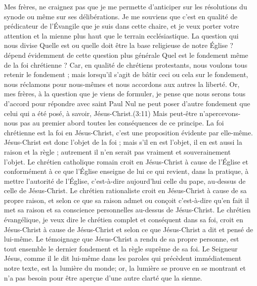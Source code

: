 Mes frères, ne craignez pas que je me permette d’anticiper sur les résolutions du synode ou même sur ses délibérations. Je me souviens que c’est en qualité de prédicateur de l’Évangile que je suis dans cette chaire, et je veux porter votre attention et la mienne plus haut que le terrain ecclésiastique. La question qui nous divise\frcolon{} \Og{} Quelle est ou quelle doit être la base religieuse de notre Église ?\Fg{} dépend évidemment de cette question plus générale\frcolon{} \Og{} Quel est le fondement même de la foi chrétienne ?\Fg{} Car, en qualité de chrétiens protestants, nous voulons tous retenir le fondement ; mais lorsqu’il s’agit de bâtir ceci ou cela sur le fondement, nous réclamons pour nous-mêmes et nous accordons aux autres la liberté.
Or, mes frères, à la question que je viens de formuler, je pense que nous serons tous d’accord pour répondre avec saint Paul\frcolon{} \Og{} Nul ne peut poser d’autre fondement que celui qui a été posé, à savoir, Jésus-Christ.(3:11)\Fg{}
Mais peut-être n’apercevons-nous pas au premier abord toutes les conséquences de ce principe. La foi chrétienne est la foi en Jésus-Christ, c’est une proposition évidente par elle-même. Jésus-Christ est donc l’objet de la foi ; mais s’il en est l’objet, il en est aussi la raison et la règle ; autrement il n’en serait pas vraiment et souverainement l’objet. Le chrétien catholique romain croit en Jésus-Christ à cause de l’Église et conformément à ce que l’Église enseigne de lui\frcolon{} ce qui revient, dans la pratique, à mettre l’autorité de l’Église, c’est-à-dire aujourd’hui celle du pape, au-dessus de celle de Jésus-Christ. Le chrétien rationaliste croit en Jésus-Christ à cause de sa propre raison, et selon ce que sa raison admet ou conçoit\frcolon{} c’est-à-dire qu’en fait il met sa raison et sa conscience personnelles au-dessus de Jésus-Christ. Le chrétien évangélique, je veux dire le chrétien complet et conséquent dans sa foi, croit en Jésus-Christ à cause de Jésus-Christ et selon ce que Jésus-Christ a dit et pensé de lui-même. Le témoignage que Jésus-Christ a rendu de sa propre personne, est tout ensemble le dernier fondement et la règle suprême de sa foi. Le Seigneur Jésus, comme il le dit lui-même dans les paroles qui précèdent immédiatement notre texte, est la lumière du monde; or, la lumière se prouve en se montrant et n’a pas besoin pour être aperçue d’une autre clarté que la sienne.
